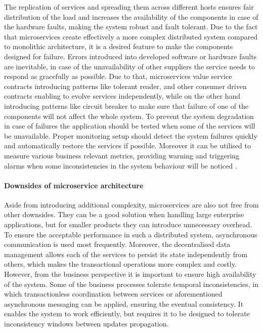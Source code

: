 The replication of services and spreading them across different hosts ensures fair distribution of the load and increases the availability of the components in case of the hardware faults, making the system robust and fault tolerant. Due to the fact that microservices create effectively a more complex distributed system compared to monolithic architecture, it is a desired feature to make the components designed for failure. Errors introduced into developed software or hardware faults are inevitable, in case of the unavailability of other suppliers the service needs to respond as gracefully as possible. Due to that, microservices value service contracts introducing patterns like tolerant reader, and other consumer driven contracts enabling to evolve services independently, while on the other hand introducing patterns like circuit breaker to make sure that failure of one of the components will not affect the whole system. To prevent the system degradation in case of failures the application should be tested when some of the services will be unavailable. Proper monitoring setup should detect the system failures quickly and automatically restore the services if possible. Moreover it can be utilised to measure various business relevant metrics, providing warning and triggering alarms when some inconsistencies in the system behaviour will be noticed \cite{MicroservicesHowToMakeYourApplicationScale}.

\paragraph{Downsides of microservice architecture}

Aside from introducing additional complexity, microservices are also not free from other downsides. They can be a good solution when handling large enterprise applications, but for smaller products they can introduce unnecessary overhead. To ensure the acceptable performance in such a distributed system, asynchronous communication is used most frequently. Moreover, the decentralised data management allows each of the services to persist its state independently from others, which makes the transactional operations more complex and costly. However, from the business perspective it is important to ensure high availability of the system. Some of the business processes tolerate temporal inconsistencies, in which transactionless coordination between services or aforementioned asynchronous messaging can be applied, ensuring the eventual consistency. It enables the system to work efficiently, but requires it to be designed to tolerate inconsistency windows between updates propagation.

